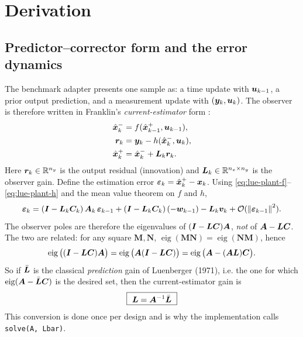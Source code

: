 \section{Derivation}

\subsection{Predictor--corrector form and the error dynamics}
The benchmark adapter presents one sample as: a time update with $\bm{u}_{k-1}$, a prior output
prediction, and a measurement update with $(\bm{y}_k,\bm{u}_k)$.  The observer is therefore written in
Franklin's \emph{current-estimator} form \cite[Sec.~8.3]{franklin1998digital}:
\begin{align}
\hat{\bm{x}}^{-}_k &= f(\hat{\bm{x}}^{+}_{k-1}, \bm{u}_{k-1}) , \label{eq:lue-predict}\\
\bm{r}_k     &= \bm{y}_k - h(\hat{\bm{x}}^{-}_k, \bm{u}_k) , \label{eq:lue-resid}\\
\hat{\bm{x}}^{+}_k  &= \hat{\bm{x}}^{-}_k + \bm{L}_k \bm{r}_k . \label{eq:lue-update}
\end{align}
Here $\bm{r}_k\in\mathbb{R}^{n_y}$ is the output residual (innovation) and
$\bm{L}_k\in\mathbb{R}^{n_x\times n_y}$ is the observer gain.  Define the estimation error
$\bm{\varepsilon}_k = \hat{\bm{x}}^{+}_k - \bm{x}_k$.  Using \eqref{eq:lue-plant-f}--\eqref{eq:lue-plant-h} and the mean
value theorem on $f$ and $h$,
\begin{equation}
\bm{\varepsilon}_k = (\bm{I} - \bm{L}_k \bm{C}_k)\,\bm{A}_k\, \bm{\varepsilon}_{k-1}
        + (\bm{I} - \bm{L}_k \bm{C}_k)\,(-\bm{w}_{k-1}) - \bm{L}_k \bm{v}_k
        + \mathcal{O}(\left\lVert \bm{\varepsilon}_{k-1} \right\rVert^2) .
\label{eq:lue-err}
\end{equation}
The observer poles are therefore the eigenvalues of $(\bm{I} - \bm{L}\bm{C})\bm{A}$, \emph{not} of
$\bm{A} - \bm{L}\bm{C}$.  The two are related: for any square $\bm{M},\bm{N}$, $\operatorname{eig}(\bm{M}\bm{N}) =
\operatorname{eig}(\bm{N}\bm{M})$, hence
\begin{equation}
\operatorname{eig}\big((\bm{I}-\bm{L}\bm{C})\bm{A}\big) = \operatorname{eig}\big(\bm{A}(\bm{I}-\bm{L}\bm{C})\big)
= \operatorname{eig}\big(\bm{A} - (\bm{A}\bm{L})\bm{C}\big) .
\label{eq:lue-currvspred}
\end{equation}
So if $\bar{\bm{L}}$ is the classical \emph{prediction} gain of Luenberger (1971), i.e. the one for
which $\operatorname{eig}(\bm{A}-\bar{\bm{L}}\bm{C})$ is the desired set, then the current-estimator gain
is
\begin{equation}
\boxed{\ \bm{L} = \bm{A}^{-1} \bar{\bm{L}} \ }
\label{eq:lue-Lconv}
\end{equation}
This conversion is done once per design and is why the implementation calls
\texttt{solve(A, Lbar)}.

